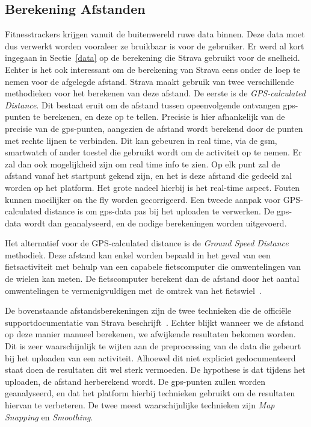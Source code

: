 \subsection{Berekening Afstanden}\label{sec:afstandsberekeningen_strava}
Fitnesstrackers krijgen vanuit de buitenwereld ruwe data binnen. Deze data moet
dus verwerkt worden vooraleer ze bruikbaar is voor de gebruiker. Er werd al
kort ingegaan in Sectie~\ref{data} op de berekening die Strava gebruikt voor de
snelheid. Echter is het ook interessant om de berekening van Strava eens onder
de loep te nemen voor de afgelegde afstand. Strava maakt gebruik van twee
verschillende methodieken voor het berekenen van deze afstand. De eerste is de
\textit{GPS-calculated Distance}. Dit bestaat eruit om de afstand tussen
opeenvolgende ontvangen \ac{gps}-punten te berekenen, en deze op te tellen.
Precisie is hier afhankelijk van de precisie van de \ac{gps}-punten, aangezien
de afstand wordt berekend door de punten met rechte lijnen te verbinden. Dit
kan gebeuren in real time, via de gsm, smartwatch of ander toestel die gebruikt
wordt om de activiteit op te nemen. Er zal dan ook mogelijkheid zijn om real
time info te zien. Op elk punt zal de afstand vanaf het startpunt gekend zijn,
en het is deze afstand die gedeeld zal worden op het platform. Het grote nadeel
hierbij is het real-time aspect. Fouten kunnen moeilijker on the fly worden
gecorrigeerd. Een tweede aanpak voor GPS-calculated distance is om
\ac{gps}-data pas bij het uploaden te verwerken. De \ac{gps}-data wordt dan
geanalyseerd, en de nodige berekeningen worden uitgevoerd.

Het alternatief voor de GPS-calculated distance is de \textit{Ground Speed
    Distance} methodiek. Deze afstand kan enkel worden bepaald in het geval van een
fietsactiviteit met behulp van een capabele fietscomputer die omwentelingen van
de wielen kan meten. De fietscomputer berekent dan de afstand door het aantal
omwentelingen te vermenigvuldigen met de omtrek van het
fietswiel~\cite{HowDista47:online}.

De bovenstaande afstandsberekeningen zijn de twee technieken die de officiële
supportdocumentatie van Strava beschrijft~\cite{HowDista47:online}. Echter
blijkt wanneer we de afstand op deze manier manueel berekenen, we afwijkende
resultaten bekomen worden. Dit is zeer waarschijnlijk te wijten aan de
preprocessing van de data die gebeurt bij het uploaden van een activiteit.
Alhoewel dit niet expliciet gedocumenteerd staat doen de resultaten dit wel
sterk vermoeden. De hypothese is dat tijdens het uploaden, de afstand
herberekend wordt. De \ac{gps}-punten zullen worden geanalyseerd, en dat het
platform hierbij technieken gebruikt om de resultaten hiervan te verbeteren. De
twee meest waarschijnlijke technieken zijn \textit{Map Snapping} en
\textit{Smoothing}.

